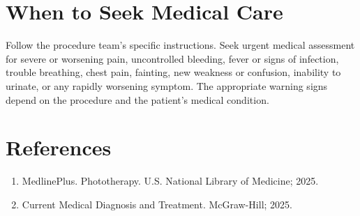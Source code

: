 \section*{When to Seek Medical Care}
Follow the procedure team's specific instructions. Seek urgent medical assessment for severe or worsening pain, uncontrolled bleeding, fever or signs of infection, trouble breathing, chest pain, fainting, new weakness or confusion, inability to urinate, or any rapidly worsening symptom. The appropriate warning signs depend on the procedure and the patient's medical condition.

\section*{References}
\begin{enumerate}
  \item MedlinePlus. Phototherapy. U.S. National Library of Medicine; 2025.
  \item Current Medical Diagnosis and Treatment. McGraw-Hill; 2025.
\end{enumerate}

\clearpage
